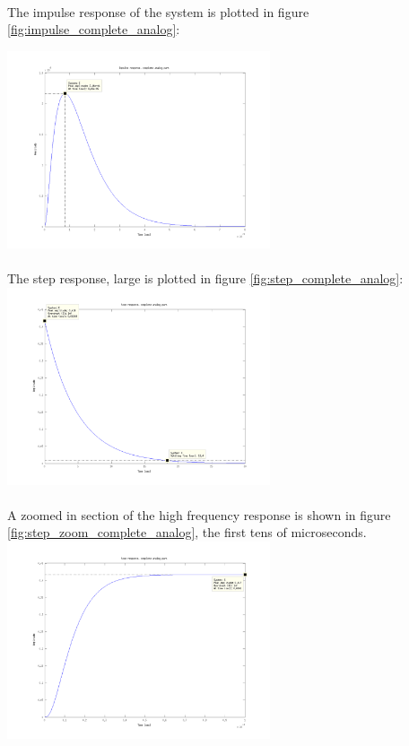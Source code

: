 \documentclass[a4paper]{article}
\begin{document}
\begin{multicols}{2}
\paragraph{}
The impulse response of the system is plotted in figure
\ref{fig:impulse_complete_analog}:

\includegraphics[width=220pt]{impulse_complete_analog.png}
\label{fig:impulse_complete_analog}

\paragraph{}
The step response, large is plotted in figure
\ref{fig:step_complete_analog}:
\includegraphics[width=220pt]{step_complete_analog.png}
\label{fig:step_complete_analog}

\paragraph{}
A zoomed in section of the high frequency response is shown in figure
\ref{fig:step_zoom_complete_analog}, the first tens of microseconds.
\includegraphics[width=220pt]{step_zoom_complete_analog.png}
\label{fig:step_zoom_complete_analog}


\end{multicols}
\end{document}
